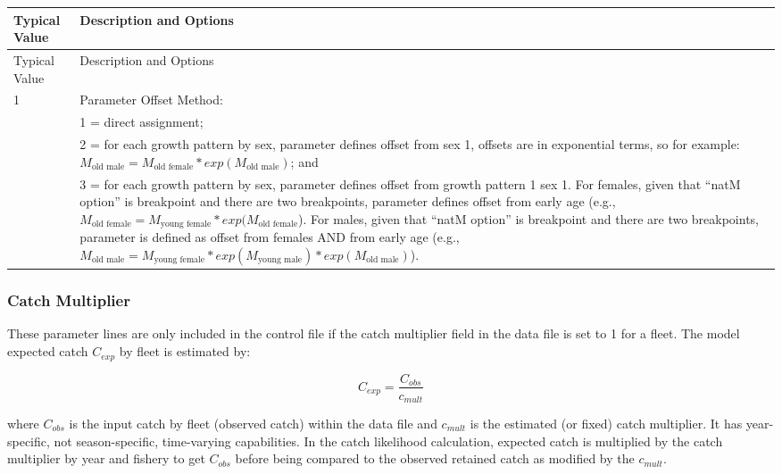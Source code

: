 \begin{longtable}{p{0.5cm} p{2cm} p{13cm}}
	\hline	
	\multicolumn{2}{l}{Typical Value} & Description and Options \Tstrut\Bstrut\\
	\hline
	\endfirsthead

	\hline
	\multicolumn{2}{l}{Typical Value} & Description and Options \Tstrut\Bstrut\\
	\hline
	\endhead
	\hline

	\endfoot
	
	\endlastfoot

	 1 & & Parameter Offset Method: \Tstrut\Bstrut\\
	   & & 1 = direct assignment; \\
	   & & 2 = for each growth pattern by sex, parameter defines offset from sex 1, offsets are in exponential terms, so for example: $M_{\text{old male}} = M_{\text{old female}}*exp(M_{\text{old male}})$; and \\
	   & & 3 = for each growth pattern by sex, parameter defines offset from growth pattern 1 sex 1. For females, given that ``natM option'' is breakpoint and there are two breakpoints, parameter defines offset from early age (e.g., $M_{\text{old female}} = M_{\text{young female}}*exp(M_{\text{old female}}$). For males, given that ``natM option'' is breakpoint and there are two breakpoints, parameter is defined as offset from females AND from early age (e.g., $M_{\text{old male}} = M_{\text{young female}}*exp(M_{\text{young male}})*exp(M_{\text{old male}})$). \Bstrut\\
	\hline
\end{longtable}


\subsubsection{Catch Multiplier}
These parameter lines are only included in the control file if the catch multiplier field in the data file is set to 1 for a fleet. The model expected catch $C_{exp}$ by fleet is estimated by:

\begin{equation}
C_{exp} = \frac{C_{obs}}{c_{mult}}
\end{equation}

where $C_{obs}$ is the input catch by fleet (observed catch) within the data file and $c_{mult}$ is the estimated (or fixed) catch multiplier. It has year-specific, not season-specific, time-varying capabilities. In the catch likelihood calculation, expected catch is multiplied by the catch multiplier by year and fishery to get $C_{obs}$ before being compared to the observed retained catch as modified by the $c_{mult}$.

